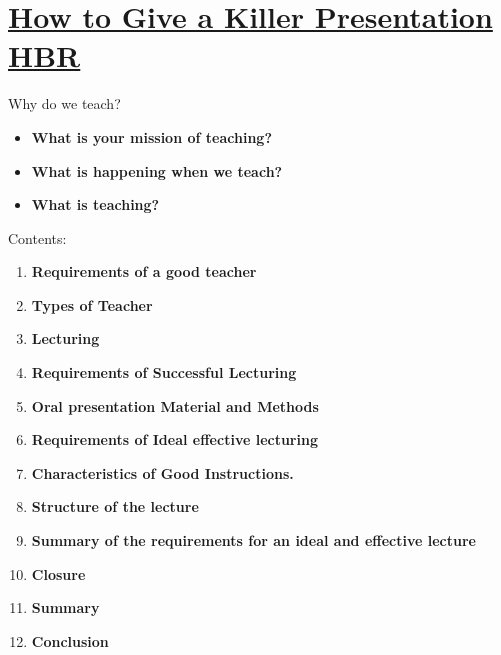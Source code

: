 \documentclass[
  ignorenonframetext,
]{beamer}
\begin{document}
\hypertarget{how-to-give-a-killer-presentation-hbr}{%
\section{\texorpdfstring{\href{https://hbr.org/2013/06/how-to-give-a-killer-presentation}{How
to Give a Killer Presentation
HBR}}{How to Give a Killer Presentation HBR}}\label{how-to-give-a-killer-presentation-hbr}}

\begin{frame}{Why do we teach?}
\protect\hypertarget{why-do-we-teach}{}
\begin{itemize}[<+->]
\item
  \textbf{What is your mission of teaching?}
\item
  \textbf{What is happening when we teach?}
\item
  \textbf{What is teaching?}
\end{itemize}
\end{frame}

\begin{frame}{}
\protect\hypertarget{section-1}{}
\end{frame}

\begin{frame}{}
\protect\hypertarget{section-2}{}
\end{frame}

\begin{frame}{Contents:}
\protect\hypertarget{contents}{}
\begin{enumerate}[<+->]
\item
  \textbf{Requirements of a good teacher}
\item
  \textbf{Types of Teacher}
\item
  \textbf{Lecturing}
\item
  \textbf{Requirements of Successful Lecturing}
\item
  \textbf{Oral presentation Material and Methods}
\item
  \textbf{Requirements of Ideal effective lecturing}
\item
  \textbf{Characteristics of Good Instructions.}
\end{enumerate}
\end{frame}

\begin{frame}{}
\protect\hypertarget{section-3}{}
\begin{enumerate}[<+->]
\setcounter{enumi}{7}
\item
  \textbf{Structure of the lecture}
\item
  \textbf{Summary of the requirements for an ideal and effective
  lecture}
\item
  \textbf{Closure}
\item
  \textbf{Summary}
\item
  \textbf{Conclusion}
\end{enumerate}
\end{frame}
\end{document}
